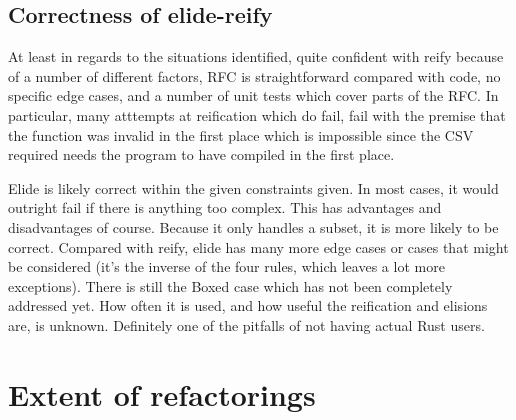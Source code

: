 \subsection{Correctness of elide-reify}

At least in regards to the situations identified, quite confident with reify because of a number of different factors, RFC is straightforward compared with code, no specific edge cases, and a number of unit tests which cover parts of the RFC. In particular, many atttempts at reification which do fail, fail with the premise that the function was invalid in the first place which is impossible since the CSV required needs the program to have compiled in the first place. 


Elide is likely correct within the given constraints given. In most cases, it would outright fail if there is anything too complex. This has advantages and disadvantages of course. Because it only handles a subset, it is more likely to be correct. Compared with reify, elide has many more edge cases or cases that might be considered (it's the inverse of the four rules, which leaves a lot more exceptions). There is still the Boxed case which has not been completely addressed yet. How often it is used, and how useful the reification and elisions are, is unknown. Definitely one of the pitfalls of not having actual Rust users. 




\section{Extent of refactorings}

